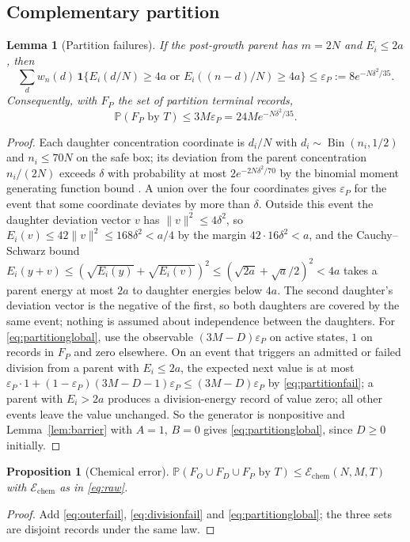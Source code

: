\documentclass[11pt,a4paper]{article}
\theoremstyle{plain}
\newtheorem{proposition}[theorem]{Proposition}
\newtheorem{lemma}[theorem]{Lemma}
\theoremstyle{definition}
\theoremstyle{remark}
\newcommand{\Prb}{\mathbb P}
\newcommand{\eps}{\varepsilon}
\newcommand{\chem}{\mathcal E_{\mathrm{chem}}}
\newcommand{\ind}{\mathbf 1}
\DeclareMathOperator{\Bin}{Bin}
\begin{document}
\subsection{Complementary partition}
\begin{lemma}[Partition failures]\label{lem:partition}
If the post-growth parent has $m=2N$ and $E_i\leq2a$, then
\begin{equation}\label{eq:partitionfail}
\sum_dw_n(d)\,\ind\{E_i(d/N)\geq4a\text{ or }E_i((n-d)/N)\geq4a\}\leq\eps_P:=8e^{-N\delta^2/35}.
\end{equation}
Consequently, with $F_P$ the set of partition terminal records,
\begin{equation}\label{eq:partitionglobal}
\Prb(F_P\text{ by }T)\leq3M\eps_P=24Me^{-N\delta^2/35}.
\end{equation}
\end{lemma}
\begin{proof}
Each daughter concentration coordinate is $d_i/N$ with $d_i\sim\Bin(n_i,1/2)$ and $n_i\leq70N$ on the safe box; its deviation from the parent concentration $n_i/(2N)$ exceeds $\delta$ with probability at most $2e^{-2N\delta^2/70}$ by the binomial moment generating function bound \citep{hoeffding1963}. A union over the four coordinates gives $\eps_P$ for the event that some coordinate deviates by more than $\delta$. Outside this event the daughter deviation vector $v$ has $\|v\|^2\leq4\delta^2$, so $E_i(v)\leq42\|v\|^2\leq168\delta^2<a/4$ by the margin $42\cdot16\delta^2<a$, and the Cauchy--Schwarz bound $E_i(y+v)\leq(\sqrt{E_i(y)}+\sqrt{E_i(v)})^2\leq(\sqrt{2a}+\sqrt{a}/2)^2<4a$ takes a parent energy at most $2a$ to daughter energies below $4a$. The second daughter's deviation vector is the negative of the first, so both daughters are covered by the same event; nothing is assumed about independence between the daughters. For \eqref{eq:partitionglobal}, use the observable $(3M-D)\eps_P$ on active states, $1$ on records in $F_P$ and zero elsewhere. On an event that triggers an admitted or failed division from a parent with $E_i\leq2a$, the expected next value is at most $\eps_P\cdot1+(1-\eps_P)(3M-D-1)\eps_P\leq(3M-D)\eps_P$ by \eqref{eq:partitionfail}; a parent with $E_i>2a$ produces a division-energy record of value zero; all other events leave the value unchanged. So the generator is nonpositive and Lemma~\ref{lem:barrier} with $A=1$, $B=0$ gives \eqref{eq:partitionglobal}, since $D\geq0$ initially.
\end{proof}

\begin{proposition}[Chemical error]\label{prop:chem}
$\Prb(F_O\cup F_D\cup F_P\text{ by }T)\leq\chem(N,M,T)$ with $\chem$ as in \eqref{eq:raw}.
\end{proposition}
\begin{proof}
Add \eqref{eq:outerfail}, \eqref{eq:divisionfail} and \eqref{eq:partitionglobal}; the three sets are disjoint records under the same law.
\end{proof}
\end{document}
